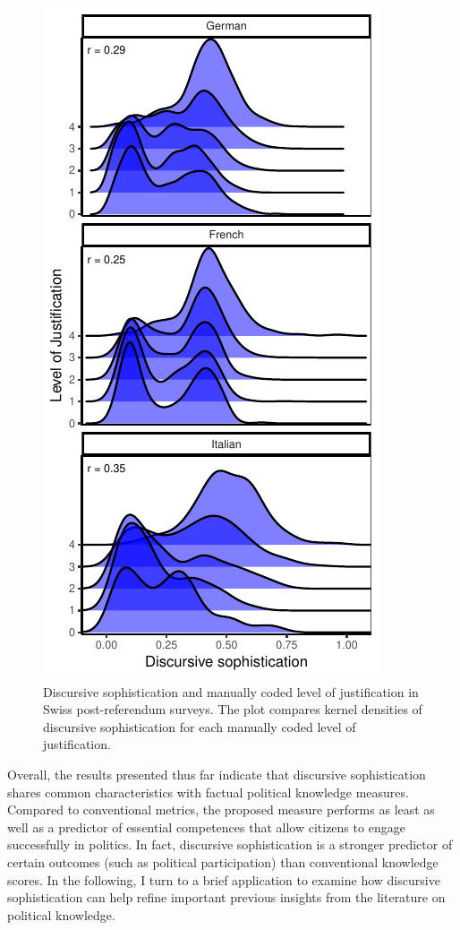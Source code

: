 \documentclass[12pt]{article}
\begin{document}
\begin{figure}[h]\centering
\includegraphics[scale=1]{../fig/swiss_ggridges.pdf}
\caption{Discursive sophistication and manually coded level of justification \citep{colombo2016justifications} in Swiss post-referendum surveys. The plot compares kernel densities of discursive sophistication for each manually coded level of justification.}\label{fig:swiss_ggridges}
\end{figure}

Overall, the results presented thus far indicate that discursive sophistication shares common characteristics with factual political knowledge measures. Compared to conventional metrics, the proposed measure performs as least as well as a predictor of essential competences that allow citizens to engage successfully in politics. In fact, discursive sophistication is a stronger predictor of certain outcomes (such as political participation) than conventional knowledge scores. In the following, I turn to a brief application to examine how discursive sophistication can help refine important previous insights from the literature on political knowledge.
\end{document}
